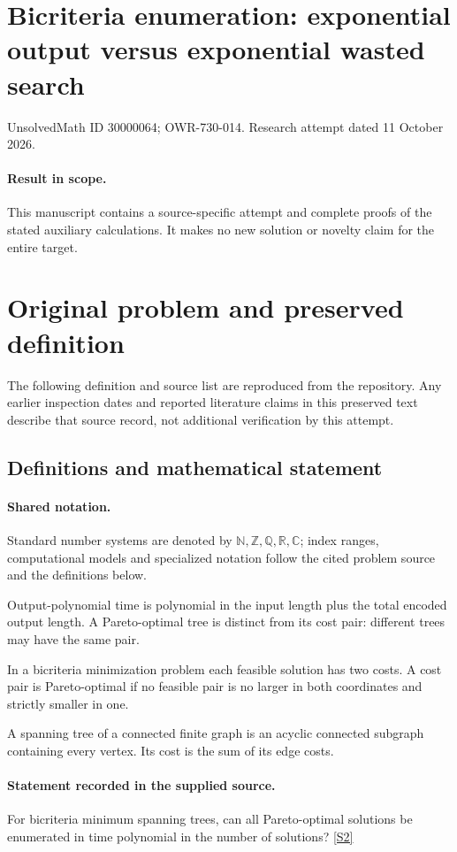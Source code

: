 \documentclass[11pt]{article}
\begin{document}
\section*{Bicriteria enumeration: exponential output versus exponential wasted search}
\noindent UnsolvedMath ID 30000064; OWR-730-014. Research attempt dated 11 October 2026.
\paragraph{Result in scope.}This manuscript contains a source-specific attempt and complete proofs of the stated auxiliary calculations. It makes no new solution or novelty claim for the entire target.
\section{Original problem and preserved definition}
The following definition and source list are reproduced from the repository. Any earlier inspection dates and reported literature claims in this preserved text describe that source record, not additional verification by this attempt.
\subsection{Definitions and mathematical statement}

\paragraph{Shared notation.}Standard number systems are denoted by $\mathbb N,\mathbb Z,\mathbb Q,\mathbb R,\mathbb C$; index ranges, computational models and specialized notation follow the cited problem source and the definitions below.


Output-polynomial time is polynomial in the input length plus the total encoded output length. A Pareto-optimal tree is distinct from its cost pair: different trees may have the same pair.

In a bicriteria minimization problem each feasible solution has two costs. A cost pair is Pareto-optimal if no feasible pair is no larger in both coordinates and strictly smaller in one.

A spanning tree of a connected finite graph is an acyclic connected subgraph containing every vertex. Its cost is the sum of its edge costs.
\paragraph{Statement recorded in the supplied source.}
For bicriteria minimum spanning trees, can all Pareto-optimal solutions be enumerated in time polynomial in the number of solutions? \href{https://doi.org/10.4171/owr/2004/28}{[S2]}
\end{document}
